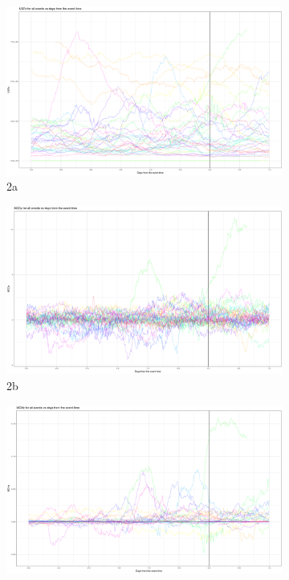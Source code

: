 \documentclass[12pt,a4paper,spanish]{article}
\begin{document}
\begin{figure}[H]
    \centering
    \begin{subfigure}{.5\textwidth}
    \centering
    \includegraphics[width=.8\linewidth,scale=0.5]{Rplot.png}
    \caption{2a}
    \label{fig:sfig21}
    \end{subfigure}%
    \begin{subfigure}{.5\textwidth}
    \centering
    \includegraphics[width=.8\linewidth,scale=0.5]{Rplot01.png}
    \caption{2b}
    \label{fig:sfig22}
    \end{subfigure}
    \begin{subfigure}{.5\textwidth}
    \centering
    \includegraphics[width=.8\linewidth,scale=0.5]{Rplot02.png}

\end{subfigure}
\end{figure}
\end{document}

